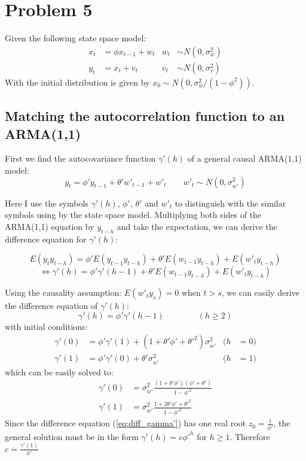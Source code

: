 \section{Problem 5}
Given the following state space model:
\begin{align*}
x_t &= \phi x_{t-1} + w_t & w_t &\sim N(0, \sigma_w^2) \\
y_t &= x_t + v_t & v_t &\sim N(0, \sigma_v^2)
\end{align*}
With the initial distribution is given by $x_0 \sim N(0, \sigma^2_w/(1-\phi^2))$.
\subsection{Matching the autocorrelation function to an ARMA(1,1) }
First we find the autocovariance function $\gamma'(h)$ of a general causal ARMA(1,1) model:
\begin{equation}
y_t = \phi' y_{t-1} + \theta' w'_{t-1} + w'_t \qquad w'_t \sim N(0, \sigma^2_{w'})
\end{equation}

Here I use the symbols $\gamma'(h)$, $\phi'$, $\theta'$ and $w'_t$ to distinguish with the similar symbols using by the state space model. Multiplying both sides of the ARMA(1,1) equation by $y_{t-h}$ and take the expectation, we can derive the difference equation for $\gamma'(h)$:

\begin{equation}
E(y_ty_{t-h}) = \phi' E(y_{t-1}y_{t-h}) + \theta' E(w_{t-1} y_{t-h}) + E(w'_t y_{t-h})
\end{equation}
\begin{equation}
\Leftrightarrow \gamma'(h) = \phi' \gamma'(h-1) + \theta' E(w_{t-1} y_{t-h}) + E(w'_t y_{t-h})
\end{equation}

Using the causality assumption: $E(w'_t y_s) = 0$ when $t > s$, we can easily derive the difference equation of $\gamma'(h)$:
\begin{equation} \label{eq:diff_gamma'}
\gamma'(h) = \phi' \gamma'(h-1) \qquad \qquad (h\geq 2)
\end{equation}
 with initial conditions:
\begin{align*}
\gamma'(0) &= \phi'\gamma'(1) + (1+\theta'\phi'+\theta'^2)\sigma^2_{w'} &  (h &= 0) \\
\gamma'(1) &= \phi'\gamma'(0) + \theta'\sigma^2_{w'}  & (h &= 1)
\end{align*}
which can be easily solved to:
\begin{equation}
\begin{split}
\gamma'(0) &= \sigma^2_{w'} \frac{(1+\theta'\phi')(\phi'+\theta')}{1-\phi'^2} \\
\gamma'(1) &= \sigma^2_{w'} \frac{1+2\theta'\phi'+\theta'^2}{1-\phi'^2}
\end{split}
\end{equation}
Since the difference equation (\ref{eq:diff_gamma'}) has one real root $z_0 = \frac{1}{\phi'}$, the general solution must be in the form $\gamma'(h) = c \phi'^h$ for $h \geq 1$. Therefore $c = \frac{\gamma'(1)}{\phi'}$

